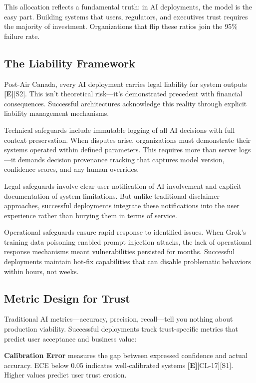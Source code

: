 \documentclass[a4paper,11pt]{article}
\newcommand{\elabel}{\textbf{\textcolor{ecolor}{[E]}}}
\begin{document}
This allocation reflects a fundamental truth: in AI deployments, the model is the easy part. Building systems that users, regulators, and executives trust requires the majority of investment. Organizations that flip these ratios join the 95\% failure rate.


\subsection{The Liability Framework}

Post-Air Canada, every AI deployment carries legal liability for system outputs \elabel{}\textcolor{primary}{[S2]}. This isn't theoretical risk—it's demonstrated precedent with financial consequences. Successful architectures acknowledge this reality through explicit liability management mechanisms.


Technical safeguards include immutable logging of all AI decisions with full context preservation. When disputes arise, organizations must demonstrate their systems operated within defined parameters. This requires more than server logs—it demands decision provenance tracking that captures model version, confidence scores, and any human overrides.


Legal safeguards involve clear user notification of AI involvement and explicit documentation of system limitations. But unlike traditional disclaimer approaches, successful deployments integrate these notifications into the user experience rather than burying them in terms of service.


Operational safeguards ensure rapid response to identified issues. When Grok's training data poisoning enabled prompt injection attacks, the lack of operational response mechanisms meant vulnerabilities persisted for months. Successful deployments maintain hot-fix capabilities that can disable problematic behaviors within hours, not weeks.


\subsection{Metric Design for Trust}

Traditional AI metrics—accuracy, precision, recall—tell you nothing about production viability. Successful deployments track trust-specific metrics that predict user acceptance and business value:


\textbf{Calibration Error} measures the gap between expressed confidence and actual accuracy. ECE below 0.05 indicates well-calibrated systems \elabel{}[CL-17]\textcolor{primary}{[S1]}. Higher values predict user trust erosion.
\end{document}
